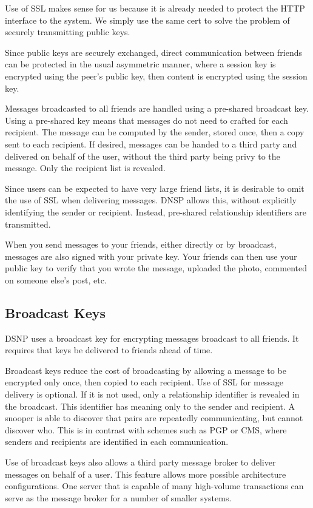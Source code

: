\documentclass[letterpaper,11pt,oneside]{article}
\begin{document}
Use of SSL makes sense for us because it is already needed to protect the HTTP
interface to the system. We simply use the same cert to solve the problem of
securely transmitting public keys.

Since public keys are securely exchanged, direct communication between friends
can be protected in the usual asymmetric manner, where a session key is
encrypted using the peer's public key, then content is encrypted using the
session key.

Messages broadcasted to all friends are handled using a pre-shared broadcast
key. Using a pre-shared key means that messages do not need to crafted for each
recipient. The message can be computed by the sender, stored once, then a copy
sent to each recipient. If desired, messages can be handed to a third party and
delivered on behalf of the user, without the third party being privy to the
message. Only the recipient list is revealed.

Since users can be expected to have very large friend lists, it is desirable to
omit the use of SSL when delivering messages. DNSP allows this, without
explicitly identifying the sender or recipient. Instead, pre-shared relationship
identifiers are transmitted.

When you send messages to your friends, either directly or by broadcast,
messages are also signed with your private key. Your friends can then use your
public key to verify that you wrote the message, uploaded the photo, commented
on someone else's post, etc.

\subsection{Broadcast Keys}

DSNP uses a broadcast key for encrypting messages broadcast to all friends.
It requires that keys be delivered to friends ahead of time.

Broadcast keys reduce the cost of broadcasting by allowing a message to be
encrypted only once, then copied to each recipient. Use of SSL for message
delivery is optional. If it is not used, only a relationship identifier is
revealed in the broadcast. This identifier has meaning only to the sender and
recipient. A snooper is able to discover that pairs are repeatedly
communicating, but cannot discover who. This is in contrast with schemes such
as PGP or CMS, where senders and recipients are identified in each
communication.

Use of broadcast keys also allows a third party message broker to deliver
messages on behalf of a user. This feature allows more possible architecture
configurations. One server that is capable of many high-volume transactions can
serve as the message broker for a number of smaller systems.
\end{document}

